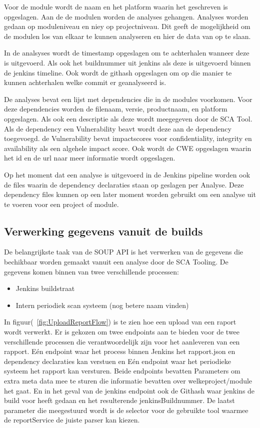 Voor de module wordt de naam en het platform waarin het geschreven is opgeslagen. Aan de de modulen worden de analyses gehangen. Analyses worden gedaan op moduleniveau en niey op projectniveau. Dit geeft de mogelijkheid om de modulen los van elkaar te kunnen analyseren en hier de data van op te slaan.

In de analsyses wordt de timestamp opgeslagen om te achterhalen wanneer deze is uitgevoerd. Als ook het buildnummer uit jenkins als deze is uitgevoerd binnen de jenkins timeline. Ook wordt de githash opgeslagen om op die manier te kunnen achterhalen welke commit er geanalyseerd is.

De analyses bevat een lijst met dependencies die in de modules voorkomen. Voor deze dependencies worden de filenaam, versie, productnaam, en platform opgeslagen. Als ook een descriptie als deze wordt meegegeven door de SCA Tool. Als de dependency een Vulnerability beavt wordt deze aan de dependency toegevoegd. de Vulnerability bevat impactscores voor confidentiality, integrity en availability als een algehele impact score. Ook wordt de CWE opgeslagen waarin het id en de url naar meer informatie wordt opgeslagen.

Op het moment dat een analyse is uitgevoerd in de Jenkins pipeline worden ook de files waarin de dependency declaraties staan op geslagen per Analyse. Deze dependency files kunnen op een later moment worden gebruikt om een analyse uit te voeren voor een project of module.

\subsection{Verwerking gegevens vanuit de builds}\label{subsec:verwerking-gegevens-vanuit-de-sca}
De belangrijkste taak van de SOUP API is het verwerken van de gegevens die bechikbaar worden gemaakt vanuit een analyse door de SCA Tooling. De gegevens komen binnen van twee verschillende processen:
\begin{itemize}
    \item Jenkins buildstraat
    \item Intern periodiek scan systeem (nog betere naam vinden)
\end{itemize}
In figuur(~\ref{fig:UploadReportFlow}) is te zien hoe een upload van een raport wordt verwerkt. Er is gekozen om twee endpoints aan te bieden voor de twee verschillende processen die verantwoordelijk zijn voor het aanleveren van een rapport. Eén endpoint waar het process binnen Jenkins het rapport.json en dependency declaraties kan verstuen en Eén endpoint waar het periodieke systeem het rapport kan versturen.
Beide endpoints bevatten Parameters om extra meta data mee te sturen die informatie bevatten over welkeproject/module het gaat. En in het geval van de jenkins endpoint ook de Githash waar jenkins de build voor heeft gedaan en het resulterende jenkinsBuildnummer. De laatst parameter die meegestuurd wordt is de selector voor de gebruikte tool waarmee de reportService de juiste parser kan kiezen.

